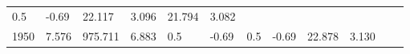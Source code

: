 \documentclass{article}
\begin{document}
\begin{longtable}[]{@{}llllllllllll@{}}
\begin{minipage}[t]{0.03\columnwidth}
0.5\strut
\end{minipage} & \begin{minipage}[t]{0.06\columnwidth}\raggedright\strut
-0.69\strut
\end{minipage} & \begin{minipage}[t]{0.06\columnwidth}\raggedright\strut
22.117\strut
\end{minipage} & \begin{minipage}[t]{0.08\columnwidth}\raggedright\strut
3.096\strut
\end{minipage} & \begin{minipage}[t]{0.06\columnwidth}\raggedright\strut
21.794\strut
\end{minipage} & \begin{minipage}[t]{0.09\columnwidth}\raggedright\strut
3.082\strut
\end{minipage}\tabularnewline
\begin{minipage}[t]{0.03\columnwidth}\raggedright\strut
1950\strut
\end{minipage} & \begin{minipage}[t]{0.06\columnwidth}\raggedright\strut
7.576\strut
\end{minipage} & \begin{minipage}[t]{0.06\columnwidth}\raggedright\strut
975.711\strut
\end{minipage} & \begin{minipage}[t]{0.08\columnwidth}\raggedright\strut
6.883\strut
\end{minipage} & \begin{minipage}[t]{0.03\columnwidth}\raggedright\strut
0.5\strut
\end{minipage} & \begin{minipage}[t]{0.06\columnwidth}\raggedright\strut
-0.69\strut
\end{minipage} & \begin{minipage}[t]{0.03\columnwidth}\raggedright\strut
0.5\strut
\end{minipage} & \begin{minipage}[t]{0.06\columnwidth}\raggedright\strut
-0.69\strut
\end{minipage} & \begin{minipage}[t]{0.06\columnwidth}\raggedright\strut
22.878\strut
\end{minipage} & \begin{minipage}[t]{0.08\columnwidth}\raggedright\strut
3.130\strut
\end{minipage} & \begin{minipage}[t]{0.06\columnwidth}\raggedright\strut

\end{minipage}
\end{longtable}
\end{document}
